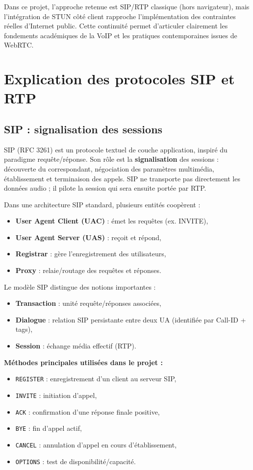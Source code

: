 \documentclass[12pt,a4paper]{article}
\begin{document}
Dans ce projet, l'approche retenue est SIP/RTP classique (hors navigateur), mais l'intégration de STUN côté client rapproche l'implémentation des contraintes réelles d'Internet public. Cette continuité permet d'articuler clairement les fondements académiques de la VoIP et les pratiques contemporaines issues de WebRTC.

\section{Explication des protocoles SIP et RTP}

\subsection{SIP : signalisation des sessions}

SIP (RFC 3261) est un protocole textuel de couche application, inspiré du paradigme requête/réponse. Son rôle est la \textbf{signalisation} des sessions : découverte du correspondant, négociation des paramètres multimédia, établissement et terminaison des appels. SIP ne transporte pas directement les données audio ; il pilote la session qui sera ensuite portée par RTP.

Dans une architecture SIP standard, plusieurs entités coopèrent :
\begin{itemize}[leftmargin=1.2cm]
    \item \textbf{User Agent Client (UAC)} : émet les requêtes (ex. INVITE),
    \item \textbf{User Agent Server (UAS)} : reçoit et répond,
    \item \textbf{Registrar} : gère l'enregistrement des utilisateurs,
    \item \textbf{Proxy} : relaie/routage des requêtes et réponses.
\end{itemize}

Le modèle SIP distingue des notions importantes :
\begin{itemize}[leftmargin=1.2cm]
    \item \textbf{Transaction} : unité requête/réponses associées,
    \item \textbf{Dialogue} : relation SIP persistante entre deux UA (identifiée par Call-ID + tags),
    \item \textbf{Session} : échange média effectif (RTP).
\end{itemize}

\textbf{Méthodes principales utilisées dans le projet :}
\begin{itemize}[leftmargin=1.2cm]
    \item \texttt{REGISTER} : enregistrement d'un client au serveur SIP,
    \item \texttt{INVITE} : initiation d'appel,
    \item \texttt{ACK} : confirmation d'une réponse finale positive,
    \item \texttt{BYE} : fin d'appel actif,
    \item \texttt{CANCEL} : annulation d'appel en cours d'établissement,
    \item \texttt{OPTIONS} : test de disponibilité/capacité.
\end{itemize}
\end{document}
